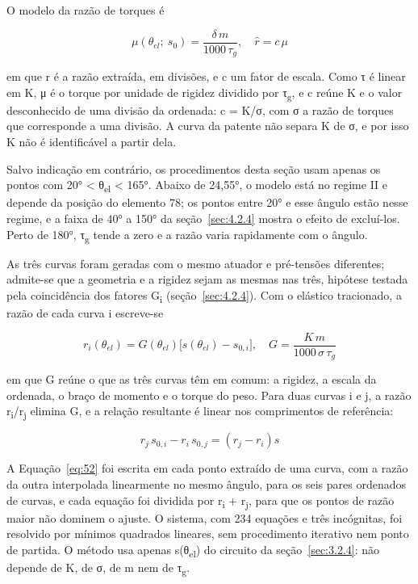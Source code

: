 O modelo da razão de torques é

\begin{equation}
  \mu(\theta_{el};\ s_{0}) = \frac{\delta\, m}{1000\,\tau_{g}},\quad\widehat{r} = c\,\mu
  \label{eq:50}
\end{equation}

em que r é a razão extraída, em divisões, e c um fator de escala. Como τ é linear em K, μ é o torque por unidade de rigidez dividido por τ\textsubscript{g}, e c reúne K e o valor desconhecido de uma divisão da ordenada: c = K/σ, com σ a razão de torques que corresponde a uma divisão. A curva da patente não separa K de σ, e por isso K não é identificável a partir dela.

Salvo indicação em contrário, os procedimentos desta seção usam apenas os pontos com 20° < θ\textsubscript{el} < 165°. Abaixo de 24,55°, o modelo está no regime II e depende da posição do elemento 78; os pontos entre 20° e esse ângulo estão nesse regime, e a faixa de 40° a 150° da seção~\ref{sec:4.2.4} mostra o efeito de excluí-los. Perto de 180°, τ\textsubscript{g} tende a zero e a razão varia rapidamente com o ângulo.

As três curvas foram geradas com o mesmo atuador e pré-tensões diferentes; admite-se que a geometria e a rigidez sejam as mesmas nas três, hipótese testada pela coincidência dos fatores G\textsubscript{i} (seção~\ref{sec:4.2.4}). Com o elástico tracionado, a razão de cada curva i escreve-se

\begin{equation}
  r_{i}(\theta_{el}) = G(\theta_{el})\lbrack s(\theta_{el}) - s_{0,i}\rbrack,\quad G = \frac{K\, m}{1000\,\sigma\,\tau_{g}}
  \label{eq:51}
\end{equation}

em que G reúne o que as três curvas têm em comum: a rigidez, a escala da ordenada, o braço de momento e o torque do peso. Para duas curvas i e j, a razão r\textsubscript{i}/r\textsubscript{j} elimina G, e a relação resultante é linear nos comprimentos de referência:

\begin{equation}
  r_{j}\, s_{0,i} - r_{i}\, s_{0,j} = (r_{j} - r_{i})s
  \label{eq:52}
\end{equation}

A Equação~\eqref{eq:52} foi escrita em cada ponto extraído de uma curva, com a razão da outra interpolada linearmente no mesmo ângulo, para os seis pares ordenados de curvas, e cada equação foi dividida por r\textsubscript{i} + r\textsubscript{j}, para que os pontos de razão maior não dominem o ajuste. O sistema, com 234 equações e três incógnitas, foi resolvido por mínimos quadrados lineares, sem procedimento iterativo nem ponto de partida. O método usa apenas s(θ\textsubscript{el}) do circuito da seção~\ref{sec:3.2.4}: não depende de K, de σ, de m nem de τ\textsubscript{g}.

